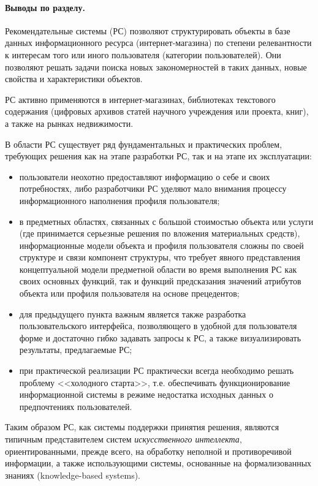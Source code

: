 \documentclass[a4paper,14pt,openany,final]{extreport} %
\begin{document}
\paragraph{Выводы по разделу.}

Рекомендательные системы (РС) позволяют структурировать объекты в базе данных информационного ресурса (интернет-магазина) по степени релевантности к интересам того или иного пользователя (категории пользователей). Они позволяют решать задачи поиска новых закономерностей в таких данных, новые свойства и характеристики объектов.

РС активно применяются в интернет-магазинах, библиотеках текстового содержания (цифровых архивов статей научного учреждения или проекта, книг), а также на рынках недвижимости.

В области РС существует ряд фундаментальных и практических проблем, требующих решения как на этапе разработки РС, так и на этапе их эксплуатации:
\begin{itemize}
\item пользователи неохотно предоставляют информацию о себе и
  своих потребностях, либо разработчики РС уделяют мало внимания
  процессу информационного наполнения профиля пользователя;
\item в предметных областях, связанных с большой стоимостью объекта или услуги (где принимается серьезные решения по вложения материальных средств), информационные модели объекта и профиля пользователя сложны по своей структуре и связи компонент структуры, что требует явного представления концептуальной модели предметной области во время выполнения РС как своих основных функций, так и функций предсказания значений атрибутов объекта или профиля пользователя на основе прецедентов;
\item для предыдущего пункта важным является также разработка пользовательского интерфейса, позволяющего в удобной для пользователя форме и достаточно гибко задавать запросы к РС, а также визуализировать результаты, предлагаемые РС;
\item при практической реализации РС практически всегда необходимо решать проблему <<холодного старта>>, т.е. обеспечивать функционирование информационной системы в режиме недостатка исходных данных о предпочтениях пользователей.
\end{itemize}

Таким образом РС, как системы поддержки принятия решения, являются типичным представителем систем \emph{искусственного интеллекта}, ориентированными, прежде всего, на обработку неполной и противоречивой информации, а также использующими системы, основанные на формализованных знаниях (\foreignlanguage{english}{knowledge-based systems}).
\end{document}
